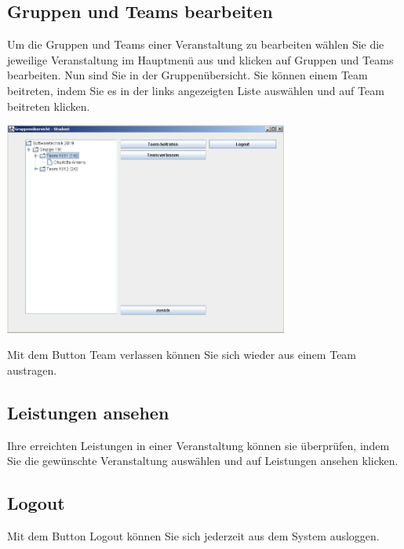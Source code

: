 \documentclass{Handbuch}
\begin{document}
\subsection{Gruppen und Teams bearbeiten}\label{sec:gruppenteamsbearbeiten}
Um die Gruppen und Teams einer Veranstaltung zu bearbeiten wählen Sie die jeweilige Veranstaltung im Hauptmenü aus und klicken auf \frqq Gruppen und Teams bearbeiten\flqq{}.
Nun sind Sie in der Gruppenübersicht. Sie können einem Team beitreten, indem Sie es in der links angezeigten Liste auswählen und auf \frqq Team beitreten\flqq{} klicken. 
\begin{center}
	\includegraphics[width=0.7\textwidth]{img_student3.jpg}
\end{center}
Mit dem Button \frqq Team verlassen\flqq{} können Sie sich wieder aus einem Team austragen.

\subsection{Leistungen ansehen}
Ihre erreichten Leistungen in einer Veranstaltung können sie überprüfen, indem Sie die gewünschte Veranstaltung auswählen und auf \frqq Leistungen ansehen\flqq{} klicken.


\subsection{Logout}
Mit dem Button \frqq Logout\flqq{} können Sie sich jederzeit aus dem System ausloggen.
\end{document}
